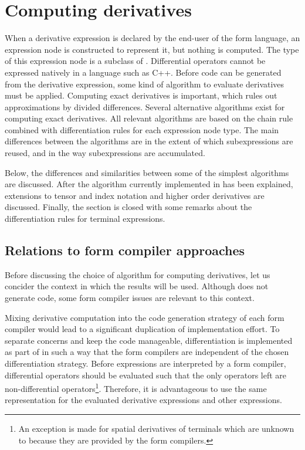 \section{Computing derivatives} \label{ufl:sec:ad}

When a derivative expression is declared by the end-user of the form
language, an expression node is constructed to represent it, but
nothing is computed.  The type of this expression node is a subclass
of .  Differential operators cannot be expressed
natively in a language such as C++.  Before code can be generated from
the derivative expression, some kind of algorithm to evaluate
derivatives must be applied.  Computing exact derivatives is
important, which rules out approximations by divided differences.
Several alternative algorithms exist for computing exact
derivatives. All relevant algorithms are based on the chain rule
combined with differentiation rules for each expression node type.
The main differences between the algorithms are in the extent of which
subexpressions are reused, and in the way subexpressions are
accumulated.

Below, the differences and similarities between some of the simplest
algorithms are discussed.  After the algorithm currently implemented
in \ufl{} has been explained, extensions to tensor and index notation
and higher order derivatives are discussed.  Finally, the section is
closed with some remarks about the differentiation rules for terminal
expressions.

\subsection{Relations to form compiler approaches}
\label{ufl:sec:fcrel}

Before discussing the choice of algorithm for computing derivatives,
let us concider the context in which the results will be used.
Although \ufl{} does not generate code, some form compiler issues are
relevant to this context.

Mixing derivative computation into the code generation strategy of
each form compiler would lead to a significant duplication of
implementation effort.  To separate concerns and keep the code
manageable, differentiation is implemented as part of \ufl{} in such a
way that the form compilers are independent of the chosen
differentiation strategy.  Before expressions are interpreted by a
form compiler, differential operators should be evaluated such that
the only operators left are non-differential operators\footnote{An
exception is made for spatial derivatives of terminals which are
unknown to \ufl{} because they are provided by the form compilers.}.
Therefore, it is advantageous to use the same representation for the
evaluated derivative expressions and other expressions.

